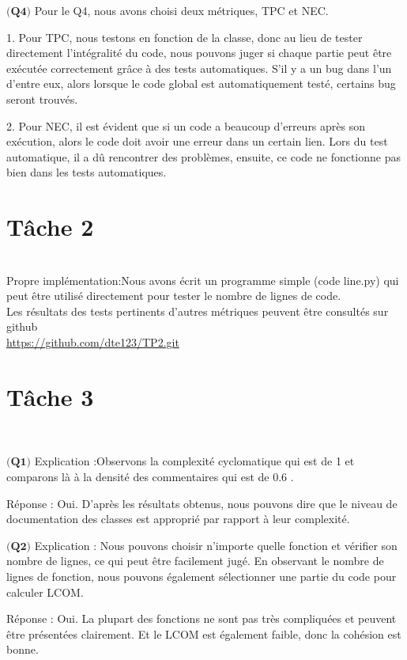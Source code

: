 \documentclass{article}
\begin{document}
\item$\textbf{(Q4)}$
Pour le Q4, nous avons choisi deux métriques, TPC et NEC.

1. Pour TPC, nous testons en fonction de la classe, donc au lieu de tester directement l'intégralité du code, nous pouvons juger si chaque partie peut être exécutée correctement grâce à des tests automatiques. S'il y a un bug dans l'un d'entre eux, alors lorsque le code global est automatiquement testé, certains bug seront trouvés.

2. Pour NEC, il est évident que si un code a beaucoup d'erreurs après son exécution, alors le code doit avoir une erreur dans un certain lien. Lors du test automatique, il a dû rencontrer des problèmes, ensuite, ce code ne fonctionne pas bien dans les tests automatiques.\\

\section*{Tâche 2}\\
Propre implémentation:Nous avons écrit un programme simple (code line.py) qui peut être utilisé directement pour tester le nombre de lignes de code.\\
Les résultats des tests pertinents d'autres métriques peuvent être consultés sur github\\
\url{https://github.com/dte123/TP2.git}

\section*{Tâche 3}\\

\item$\textbf{(Q1)}$
Explication :Observons la complexité cyclomatique qui est de 1 et  comparons là à la densité des commentaires qui est de 0.6  . 

Réponse : Oui. D'après les résultats obtenus, nous pouvons dire que le niveau de documentation des classes est approprié par rapport à leur complexité.

\item$\textbf{(Q2)}$
Explication : Nous pouvons choisir n'importe quelle fonction et vérifier son nombre de lignes, ce qui peut être facilement jugé. En observant le nombre de lignes de fonction, nous pouvons également sélectionner une partie du code pour calculer LCOM.

Réponse : Oui. La plupart des fonctions ne sont pas très compliquées et peuvent être présentées clairement. Et le LCOM est également faible, donc la cohésion est bonne.
\end{document}
